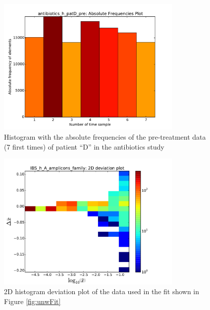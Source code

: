 \begin{figure}
	\centering
	\includegraphics[width=0.8\textwidth]{results/hist/antibiotics_h_patD_pre_AbsFreqPlot}
	\caption{Histogram with the absolute frequencies of the pre-treatment data (7 first times) of patient ``D'' in the antibiotics study\cite{antibiotic}}
	\label{fig:histAFP}
\end{figure}

\begin{figure}
	\centering
	\includegraphics[width=0.8\textwidth]{results/hist/IBS_h_A_amplicons_family_hist2D.pdf}
	\caption{2D histogram deviation plot of the data used in the fit shown in Figure \ref{fig:unwFit}}
	\label{fig:hist2D}
\end{figure}


